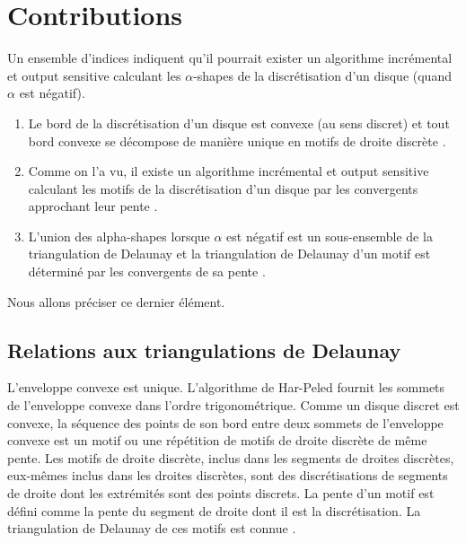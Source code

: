 \section{Contributions}

Un ensemble d'indices indiquent qu'il pourrait exister 
un algorithme incrémental et output sensitive calculant 
les $\alpha$-shapes de la discrétisation d'un disque
(quand $\alpha$ est négatif). 

\begin{enumerate}
\item Le bord de la discrétisation d'un disque est convexe 
(au sens discret) et tout bord convexe se décompose de manière 
unique en motifs de droite discrète \cite{roussillonPR2011}. 
\item Comme on l'a vu, il existe un algorithme incrémental et output sensitive 
calculant les motifs de la discrétisation d'un disque par les 
convergents approchant leur pente \cite{HarPeled98}. 
\item L'union des alpha-shapes lorsque $\alpha$ est négatif 
est un sous-ensemble de la triangulation de Delaunay \cite{EdeKirSei83}
et la triangulation de Delaunay d'un motif est déterminé par 
les convergents de sa pente \cite{RoussillonL11}. 
\end{enumerate}

Nous allons préciser ce dernier élément. 

\subsection{Relations aux triangulations de Delaunay}


L'enveloppe convexe est unique. L'algorithme de Har-Peled fournit les sommets de l'enveloppe convexe dans l'ordre trigonométrique. Comme un disque discret est convexe, la séquence des points de son bord entre deux sommets de l'enveloppe convexe est un motif ou une répétition de motifs de droite discrète de même pente. Les motifs de droite discrète, inclus dans les segments de droites discrètes, eux-mêmes inclus dans les droites discrètes, sont des discrétisations de segments de droite dont les extrémités sont des points discrets. La pente d'un motif est défini comme la pente du segment de droite dont il est la discrétisation. La triangulation de Delaunay de ces motifs est connue \cite{RoussillonL11}.\\

